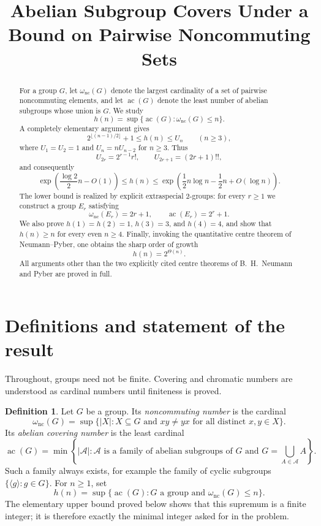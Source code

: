 \documentclass[11pt]{article}
\title{Abelian Subgroup Covers Under a Bound on Pairwise Noncommuting Sets}
\author{}
\date{}
\theoremstyle{definition}
\newtheorem{definition}[theorem]{Definition}
\newcommand{\nc}{\omega_{\mathrm{nc}}}
\newcommand{\ac}{\operatorname{ac}}
\begin{document}
\maketitle

\begin{abstract}
For a group $G$, let $\nc(G)$ denote the largest cardinality of a set of pairwise noncommuting elements, and let $\ac(G)$ denote the least number of abelian subgroups whose union is $G$.  We study
\[
 h(n)=\sup\{\ac(G):\nc(G)\le n\}.
\]
A completely elementary argument gives
\[
 2^{\lfloor (n-1)/2\rfloor}+1\le h(n)\le U_n\qquad(n\ge3),
\]
where $U_1=U_2=1$ and $U_n=nU_{n-2}$ for $n\ge3$.  Thus
\[
 U_{2r}=2^{r-1}r!,\qquad U_{2r+1}=(2r+1)!!,
\]
and consequently
\[
 \exp\!\left(\frac{\log 2}{2}n-O(1)\right)
 \le h(n)\le
 \exp\!\left(\frac12n\log n-\frac12n+O(\log n)\right).
\]
The lower bound is realized by explicit extraspecial $2$-groups: for every $r\ge1$ we construct a group $E_r$ satisfying
\[
 \nc(E_r)=2r+1,
 \qquad
 \ac(E_r)=2^r+1.
\]
We also prove $h(1)=h(2)=1$, $h(3)=3$, and $h(4)=4$, and show that $h(n)\ge n$ for every even $n\ge4$.  Finally, invoking the quantitative centre theorem of Neumann--Pyber, one obtains the sharp order of growth
\[
 h(n)=2^{\Theta(n)}.
\]
All arguments other than the two explicitly cited centre theorems of B.~H.~Neumann and Pyber are proved in full.
\end{abstract}

\section{Definitions and statement of the result}

Throughout, groups need not be finite.  Covering and chromatic numbers are understood as cardinal numbers until finiteness is proved.

\begin{definition}
Let $G$ be a group.  Its \emph{noncommuting number} is the cardinal
\[
 \nc(G)=\sup\bigl\{|X|:X\subseteq G\text{ and }xy\ne yx
     \text{ for all distinct }x,y\in X\bigr\}.
\]
Its \emph{abelian covering number} is the least cardinal
\[
 \ac(G)=\min\left\{|\mathcal A|:\mathcal A\text{ is a family of abelian
 subgroups of }G\text{ and }G=\bigcup_{A\in\mathcal A}A\right\}.
\]
Such a family always exists, for example the family of cyclic subgroups
$\{\langle g\rangle:g\in G\}$.  For $n\ge1$, set
\[
 h(n)=\sup\{\ac(G):G\text{ a group and }\nc(G)\le n\}.
\]
The elementary upper bound proved below shows that this supremum is a finite
integer; it is therefore exactly the minimal integer asked for in the problem.
\end{definition}
\end{document}
